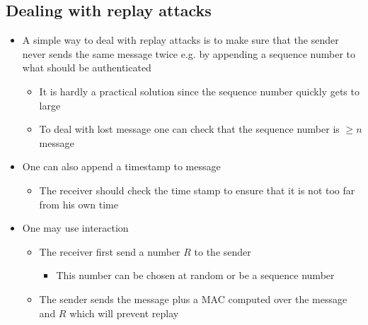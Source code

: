 \subsection{Dealing with replay attacks}
\begin{itemize}
  \item A simple way to deal with replay attacks is to make sure that the sender never sends the same message twice e.g. by appending a sequence number to what should be authenticated
  \begin{itemize}
  	\item It is hardly a practical solution since the sequence number quickly gets to large
  	\item To deal with lost message one can check that the sequence number is $\geq n$ message
  \end{itemize}

  \item One can also append a timestamp to message
  \begin{itemize}
  	\item The receiver should check the time stamp to ensure that it is not too far from his own time
  \end{itemize}

  \item One may use interaction
  \begin{itemize}
  	\item The receiver first send a number $R$ to the sender
    \begin{itemize}
  	  \item This number can be chosen at random or be a sequence number
    \end{itemize}
  	\item The sender sends the message plus a MAC computed over the message and $R$ which will prevent replay
  \end{itemize}
\end{itemize}




